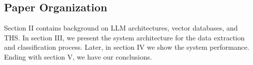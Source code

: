 \subsection{Paper Organization}
Section II contains background on LLM  architectures, vector databases, and THS. In section III, we present the system architecture for the data extraction and classification process. Later, in section IV we show the system performance. Ending with section V, we have our conclusions. %

